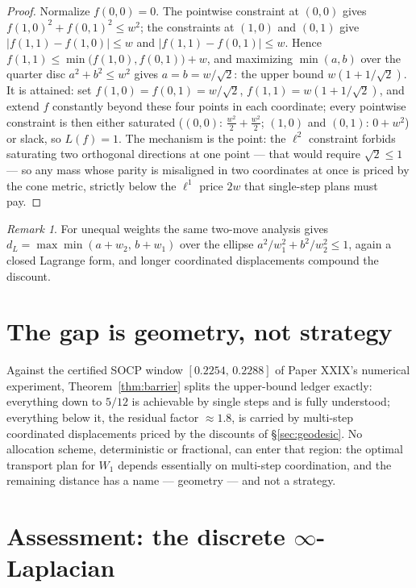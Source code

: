 \documentclass[11pt]{amsart}
\theoremstyle{remark}
\newtheorem{remark}[theorem]{Remark}
\begin{document}
\begin{proof}
Normalize $f(0,0)=0$. The pointwise constraint at $(0,0)$ gives
$f(1,0)^2+f(0,1)^2\le w^2$; the constraints at $(1,0)$ and $(0,1)$ give
$|f(1,1)-f(1,0)|\le w$ and $|f(1,1)-f(0,1)|\le w$. Hence
$f(1,1)\le\min\bigl(f(1,0),f(0,1)\bigr)+w$, and maximizing $\min(a,b)$ over the quarter
disc $a^2+b^2\le w^2$ gives $a=b=w/\sqrt2$: the upper bound
$w(1+1/\sqrt2)$. It is attained: set $f(1,0)=f(0,1)=w/\sqrt2$,
$f(1,1)=w(1+1/\sqrt2)$, and extend $f$ constantly beyond these four points in each
coordinate; every pointwise constraint is then either saturated
($(0,0)$: $\tfrac{w^2}2+\tfrac{w^2}2$; $(1,0)$ and $(0,1)$: $0+w^2$) or slack, so
$L(f)=1$. The mechanism is the point: the $\ell^2$ constraint forbids saturating two
orthogonal directions at one point --- that would require $\sqrt2\le1$ --- so any mass
whose parity is misaligned in two coordinates at once is priced by the cone metric,
strictly below the $\ell^1$ price $2w$ that single-step plans must pay.
\end{proof}

\begin{remark}
For unequal weights the same two-move analysis gives
$d_L=\max\min(a+w_2,\,b+w_1)$ over the ellipse $a^2/w_1^2+b^2/w_2^2\le1$, again a closed
Lagrange form, and longer coordinated displacements compound the discount.
\end{remark}

\section{The gap is geometry, not strategy}\label{sec:verdict}

Against the certified SOCP window $[0.2254,\,0.2288]$ of Paper XXIX's numerical
experiment, Theorem~\ref{thm:barrier} splits the upper-bound ledger exactly: everything
down to $5/12$ is achievable by single steps and is fully understood; everything below
it, the residual factor $\approx1.8$, is carried by multi-step coordinated displacements
priced by the discounts of \S\ref{sec:geodesic}. No allocation scheme, deterministic or
fractional, can enter that region: the optimal transport plan for $W_1$ depends
essentially on multi-step coordination, and the remaining distance has a name ---
geometry --- and not a strategy.

\section{Assessment: the discrete \texorpdfstring{$\infty$}{infinity}-Laplacian}\label{sec:assessment}
\end{document}
